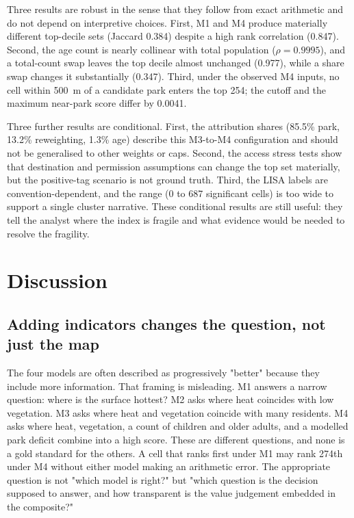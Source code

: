 \documentclass[times,twoside]{_Templates/MultiTargetManuscript}
\begin{document}
Three results are robust in the sense that they follow from exact arithmetic and
do not depend on interpretive choices. First, M1 and M4 produce materially
different top-decile sets (Jaccard 0.384) despite a high rank correlation
(0.847). Second, the age count is nearly collinear with total population
($\rho=0.9995$), and a total-count swap leaves the top decile almost unchanged
(0.977), while a share swap changes it substantially (0.347). Third, under the
observed M4 inputs, no cell within 500~m of a candidate park enters the top 254;
the cutoff and the maximum near-park score differ by 0.0041.

Three further results are conditional. First, the attribution shares (85.5\%
park, 13.2\% reweighting, 1.3\% age) describe this M3-to-M4 configuration and
should not be generalised to other weights or caps. Second, the access stress
tests show that destination and permission assumptions can change the top set
materially, but the positive-tag scenario is not ground truth. Third, the LISA
labels are convention-dependent, and the range (0 to 687 significant cells) is
too wide to support a single cluster narrative. These conditional results are
still useful: they tell the analyst where the index is fragile and what evidence
would be needed to resolve the fragility.

\section{Discussion}

\subsection{Adding indicators changes the question, not just the map}

The four models are often described as progressively "better" because they
include more information. That framing is misleading. M1 answers a narrow
question: where is the surface hottest? M2 asks where heat coincides with low
vegetation. M3 asks where heat and vegetation coincide with many residents. M4
asks where heat, vegetation, a count of children and older adults, and a modelled
park deficit combine into a high score. These are different questions, and none
is a gold standard for the others. A cell that ranks first under M1 may rank
274th under M4 without either model making an arithmetic error. The appropriate
question is not "which model is right?" but "which question is the decision
supposed to answer, and how transparent is the value judgement embedded in the
composite?"
\end{document}
